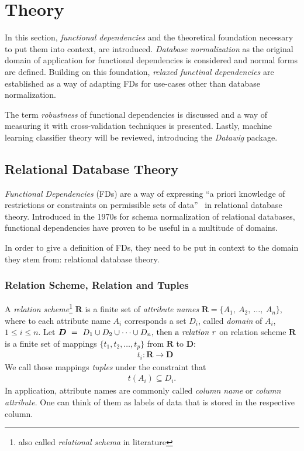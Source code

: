 \newpage
\section{Theory}

In this section, \emph{functional dependencies} and the theoretical foundation necessary to put them into context, are introduced.
\emph{Database normalization} as the original domain of application for functional dependencies is considered and normal forms are defined.
Building on this foundation, \emph{relaxed functinal dependencies} are established as a way of adapting FDs for use-cases other than database normalization.

The term \emph{robustness} of functional dependencies is discussed and a way of measuring it with cross-validation techniques is presented.
Lastly, machine learning classifier theory will be reviewed, introducing the \emph{Datawig} package.

\subsection{Relational Database Theory}
\emph{Functional Dependencies} (FDs) are a way of expressing ``a priori knowledge of restrictions or constraints on permissible sets of data''~\cite[p.~42]{MAI83} in relational database theory.
Introduced in the 1970s for schema normalization of relational databases, functional dependencies have proven to be useful in a multitude of domains.

In order to give a definition of FDs, they need to be put in context to the domain they stem from: relational database theory.

\subsubsection{Relation Scheme, Relation and Tuples}
A \emph{relation scheme}\footnote{also called \emph{relational schema} in literature\cite[p.21]{ABE19} } \(\boldsymbol{R}\) is a finite set of \emph{attribute names} \( \boldsymbol{R} = \{A_1,~A_2,~\dots,~A_n\}\), where to each attribute name \(A_i\) corresponds a set \(D_i\), called \emph{domain} of \(A_i\), \(1 \leq i \leq n\).
Let \(\boldsymbol{D}~=~D_1 \cup D_2 \cup \dots \cup D_n$, then a \emph{relation} \(r\) on relation scheme \(\boldsymbol{R}\) is a finite set of mappings \(\{t_1, t_2, \dots, t_p\}\) from \(\boldsymbol{R}\) to \(\boldsymbol{D}\):
\begin{align*}
  &t_i: \boldsymbol{R} \to \boldsymbol{D}
\end{align*}
We call those mappings \emph{tuples} under the constraint that~\cite[p.2]{MAI83}
\begin{align*}
    t(A_i) \subseteq D_i.
\end{align*}
In application, attribute names are commonly called \emph{column name} or \emph{column attribute}.
One can think of them as labels of data that is stored in the respective column.


